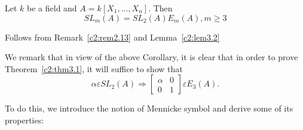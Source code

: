 \begin{coro}\label{c2:coro3.3}
Let $k$ be a field and $A=k[X_1,\ldots,X_n]$. Then 
$$
SL_m(A)=SL_2(A)E_m(A),m\geq 3
$$
\end{coro}

\begin{Proof}
Follows from Remark~\ref{c2:rem2.13} and Lemma~\ref{c2:lem3.2}

We remark that in view of the above Corollary, it is clear that in
order to prove Theorem~\ref{c2:thm3.1}, it will suffice to show that 
$$
\alpha\varepsilon SL_2(A)\Rightarrow
\begin{bmatrix}
\alpha & 0\\
0 & 1
\end{bmatrix} \varepsilon E_3(A).
$$

To do this, we introduce the notion of Mennicke symbol and derive some
of its properties:
\enprf
\end{Proof}

